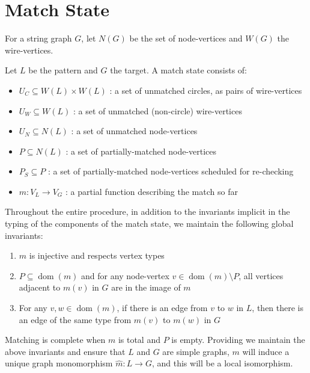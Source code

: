 \documentclass{article}
\DeclareMathOperator{\dom}{dom}
\begin{document}
\section{Match State}
\label{sec:match-state}

For a string graph $G$, let $N(G)$ be the set of node-vertices and $W(G)$ the wire-vertices.

Let $L$ be the pattern and $G$ the target. A match state consists of:

\begin{itemize}
    \item $U_C \subseteq W(L)\times W(L)$ : a set of unmatched circles, as pairs of wire-vertices
    \item $U_W \subseteq W(L)$ : a set of unmatched (non-circle) wire-vertices
    \item $U_N \subseteq N(L)$ : a set of unmatched node-vertices
    \item $P \subseteq N(L)$ : a set of partially-matched node-vertices
    \item $P_S \subseteq P$ : a set of partially-matched node-vertices scheduled for re-checking
    \item $m : V_L \rightarrow V_G$ : a partial function describing the match so far
\end{itemize}

Throughout the entire procedure, in addition to the invariants implicit in the typing of the components of the match state, we maintain the following global invariants:
\begin{enumerate}
  \renewcommand{\theenumi}{(\arabic{enumi})}
  \renewcommand{\labelenumi}{\theenumi}
  \item \label{enum:g-inv-inj} $m$ is injective and respects vertex types
  \item \label{enum:g-inv-local-iso} $P \subseteq \dom(m)$ and for any node-vertex $v \in \dom(m)\setminus P$, all vertices adjacent to $m(v)$ in $G$ are in the image of $m$
  \item \label{enum:g-inv-edge-match} For any $v,w \in \dom(m)$, if there is an edge from $v$ to $w$ in $L$, then there is an edge of the same type from $m(v)$ to $m(w)$ in $G$
\end{enumerate}

Matching is complete when $m$ is total and $P$ is empty.  Providing we maintain the above invariants and ensure that $L$ and $G$ are simple graphs, $m$ will induce a unique graph monomorphism $\hat m:L \rightarrow G$, and this will be a local isomorphism.
\end{document}
